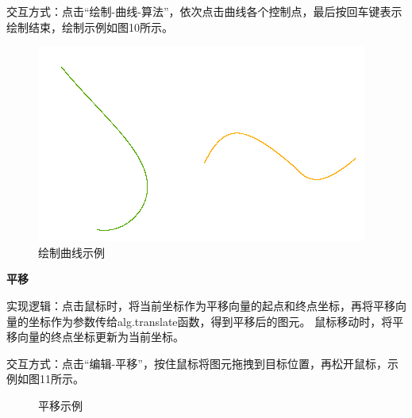 \documentclass[a4paper,UTF8]{article}
\theoremstyle{definition}
\begin{document}
交互方式：点击“绘制-曲线-算法”，依次点击曲线各个控制点，最后按回车键表示绘制结束，绘制示例如图10所示。
\begin{figure}[H]
    \centering
    \includegraphics[scale=0.8]{draw-curve.PNG}
    \caption{绘制曲线示例}
\end{figure}

\textbf{平移}

实现逻辑：点击鼠标时，将当前坐标作为平移向量的起点和终点坐标，再将平移向量的坐标作为参数传给alg.translate函数，得到平移后的图元。
鼠标移动时，将平移向量的终点坐标更新为当前坐标。

交互方式：点击“编辑-平移”，按住鼠标将图元拖拽到目标位置，再松开鼠标，示例如图11所示。
\begin{figure}[H]
    \centering
        \caption{平移示例}
        \label{fig:1}
\end{figure}
\end{document}
